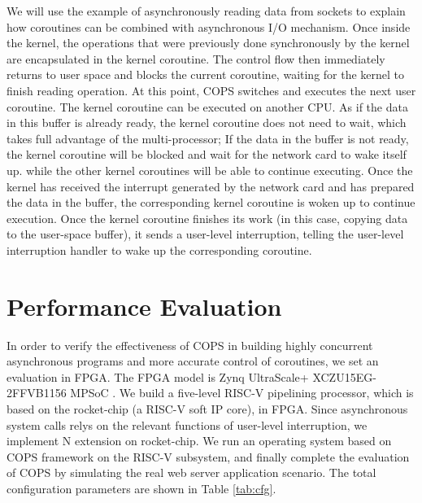 \documentclass[sigconf,review,anonymous]{acmart}
\begin{document}
We will use the example of asynchronously reading data from sockets to explain how coroutines can be combined with asynchronous I/O mechanism. Once inside the kernel, the operations that were previously done synchronously by the kernel are encapsulated in the kernel coroutine. The control flow then immediately returns to user space and blocks the current coroutine, waiting for the kernel to finish reading operation. At this point, COPS switches and executes the next user coroutine. The kernel coroutine can be executed on another CPU. As if the data in this buffer is already ready, the kernel coroutine does not need to wait, which takes full advantage of the multi-processor; If the data in the buffer is not ready, the kernel coroutine will be blocked and wait for the network card to wake itself up. while the other kernel coroutines will be able to continue executing. Once the kernel has received the interrupt generated by the network card and has prepared the data in the buffer, the corresponding kernel coroutine is woken up to continue execution. Once the kernel coroutine finishes its work (in this case, copying data to the user-space buffer), it sends a user-level interruption, telling the user-level interruption handler to wake up the corresponding coroutine.

\section{Performance Evaluation}

In order to verify the effectiveness of COPS in building highly concurrent asynchronous programs and more accurate control of coroutines, we set an evaluation in FPGA. The FPGA model is Zynq UltraScale+ XCZU15EG-2FFVB1156 MPSoC \cite{zynq}. We build a five-level RISC-V pipelining processor, which is based on the rocket-chip \cite{rocket-chip} (a RISC-V soft IP core), in FPGA. Since asynchronous system calls relys on the relevant functions of user-level interruption, we implement N extension \cite{waterman_volume_nodate} on rocket-chip. We run an operating system based on COPS framework on the RISC-V subsystem, and finally complete the evaluation of COPS by simulating the real web server application scenario. The total configuration parameters are shown in Table \ref{tab:cfg}.
\end{document}
